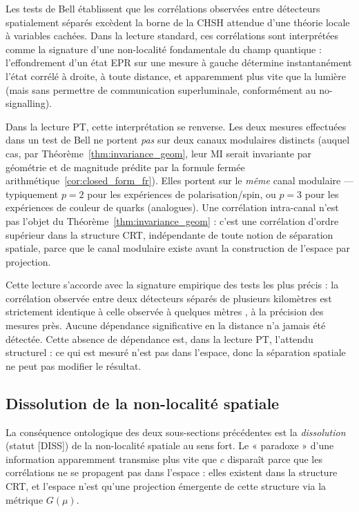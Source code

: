 Les tests de Bell \cite{Bell1964,Aspect1982,Hensen2015}
établissent que les corrélations observées entre détecteurs
spatialement séparés excèdent la borne de la
CHSH \cite{CHSH1969} attendue d'une théorie locale à variables
cachées. Dans la lecture standard, ces corrélations sont
interprétées comme la signature d'une non-localité fondamentale du
champ quantique : l'effondrement d'un état EPR sur une mesure à
gauche détermine instantanément l'état corrélé à droite, à toute
distance, et apparemment plus vite que la lumière (mais sans
permettre de communication superluminale, conformément au
no-signalling).

Dans la lecture PT, cette interprétation se renverse. Les deux
mesures effectuées dans un test de Bell ne portent \emph{pas} sur
deux canaux modulaires distincts (auquel cas, par
Théorème~\ref{thm:invariance_geom}, leur MI serait invariante par
géométrie et de magnitude prédite par la formule fermée
arithmétique~\eqref{cor:closed_form_fr}). Elles portent sur le
\emph{même} canal modulaire --- typiquement $p = 2$ pour les
expériences de polarisation/spin, ou $p = 3$ pour les expériences
de couleur de quarks (analogues). Une corrélation intra-canal
n'est pas l'objet du
Théorème~\ref{thm:invariance_geom} : c'est une corrélation
d'ordre supérieur dans la structure CRT, indépendante de toute
notion de séparation spatiale, parce que le canal modulaire
existe avant la construction de l'espace par projection.

Cette lecture s'accorde avec la signature
empirique des tests les plus précis : la corrélation observée
entre deux détecteurs séparés de plusieurs kilomètres
\cite{Hensen2015} est strictement identique à celle observée à
quelques mètres \cite{Aspect1982}, à la précision des mesures
près. Aucune dépendance significative en la distance n'a jamais
été détectée. Cette absence de dépendance est, dans la lecture
PT, l'attendu structurel : ce qui est mesuré n'est pas dans
l'espace, donc la séparation spatiale ne peut pas modifier le
résultat.

\subsection{Dissolution de la non-localité spatiale}
\label{ssec:dissolution_consequence}

La conséquence ontologique des deux sous-sections précédentes est
la \emph{dissolution} (statut [DISS]) de la non-localité spatiale
au sens fort. Le « paradoxe » d'une information apparemment
transmise plus vite que $c$ disparaît parce que les corrélations
ne se propagent pas dans l'espace : elles existent dans la
structure CRT, et l'espace n'est qu'une projection émergente de
cette structure via la métrique $G(\mu)$.

